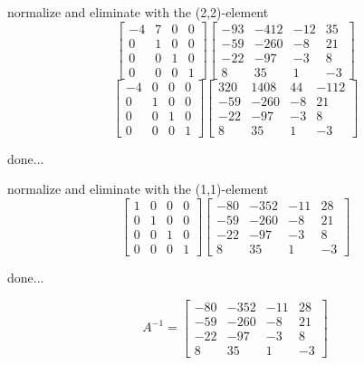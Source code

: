 \documentclass[12pt]{article}
\begin{document}
normalize and eliminate with the (2,2)-element
$$\left[{\begin{array}{cccc}-4& 7& 0& 0\\ 0& 1& 0& 0\\ 0& 0& 1& 0\\ 0& 0& 0& 1\end{array}}\right]\left[{\begin{array}{cccc}-93& -412& -12& 35\\ -59& -260& -8& 21\\ -22& -97& -3& 8\\ 8& 35& 1& -3\end{array}}\right]$$
$$\left[{\begin{array}{cccc}-4& 0& 0& 0\\ 0& 1& 0& 0\\ 0& 0& 1& 0\\ 0& 0& 0& 1\end{array}}\right]\left[{\begin{array}{cccc}320& 1408& 44& -112\\ -59& -260& -8& 21\\ -22& -97& -3& 8\\ 8& 35& 1& -3\end{array}}\right]$$
\par\noindent done...


normalize and eliminate with the (1,1)-element
$$\left[{\begin{array}{cccc}1& 0& 0& 0\\ 0& 1& 0& 0\\ 0& 0& 1& 0\\ 0& 0& 0& 1\end{array}}\right]\left[{\begin{array}{cccc}-80& -352& -11& 28\\ -59& -260& -8& 21\\ -22& -97& -3& 8\\ 8& 35& 1& -3\end{array}}\right]$$
\par\noindent done...


$$ A^{-1}=\left[{\begin{array}{cccc}-80& -352& -11& 28\\ -59& -260& -8& 21\\ -22& -97& -3& 8\\ 8& 35& 1& -3\end{array}}\right]$$
\end{document}
